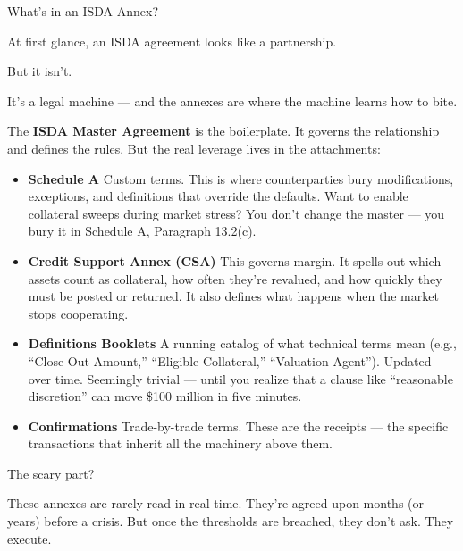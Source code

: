 \begin{TechnicalSidebar}{What’s in an ISDA Annex?}

  At first glance, an ISDA agreement looks like a partnership.

  \medskip
  
  But it isn’t.

  \medskip
  
  It’s a legal machine — and the annexes are where the machine learns how to bite.
  
  \medskip
  
  The \textbf{ISDA Master Agreement} is the boilerplate. It governs the relationship and defines the rules. But the real leverage lives in the attachments:

  \medskip
  
  \begin{itemize}
    \item \textbf{Schedule A}  
    Custom terms. This is where counterparties bury modifications, exceptions, and definitions that override the defaults. Want to enable collateral sweeps during market stress? You don’t change the master — you bury it in Schedule A, Paragraph 13.2(c).
  
    \item \textbf{Credit Support Annex (CSA)}  
    This governs margin. It spells out which assets count as collateral, how often they’re revalued, and how quickly they must be posted or returned. It also defines what happens when the market stops cooperating.
  
    \item \textbf{Definitions Booklets}  
    A running catalog of what technical terms mean (e.g., “Close-Out Amount,” “Eligible Collateral,” “Valuation Agent”). Updated over time. Seemingly trivial — until you realize that a clause like “reasonable discretion” can move \$100 million in five minutes.
  
    \item \textbf{Confirmations}  
    Trade-by-trade terms. These are the receipts — the specific transactions that inherit all the machinery above them.
  \end{itemize}
  
  \medskip
  
  The scary part?

  \medskip
  
  These annexes are rarely read in real time.  
  They’re agreed upon months (or years) before a crisis.  
  But once the thresholds are breached, they don’t ask. They execute.
  
\end{TechnicalSidebar}

